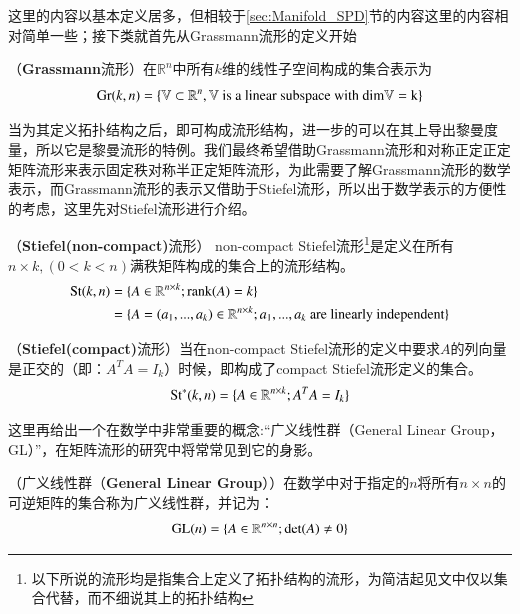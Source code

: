 这里的内容以基本定义居多，但相较于\ref{sec:Manifold_SPD}节的内容这里的内容相对简单一些；接下类就首先从Grassmann流形的定义开始
\begin{definition}
\label{Grassmann_def}
{\heiti （\textbf{Grassmann}流形）}在$\mathbb{R}^n$中所有$k$维的线性子空间构成的集合表示为
\begin{equation}
{\rm Gr}(k,n)=\{\mathbb{V} \subset \mathbb{R}^n,\mathbb{V}\text{ is a linear subspace with }\rm{dim}\mathbb{V}=k\}
\end{equation}
\end{definition}
当为其定义拓扑结构之后，即可构成流形结构，进一步的可以在其上导出黎曼度量\cite{Grassmann}，所以它是黎曼流形的特例。我们最终希望借助Grassmann流形和对称正定正定矩阵流形来表示固定秩对称半正定矩阵流形，为此需要了解Grassmann流形的数学表示，而Grassmann流形的表示又借助于Stiefel流形，所以出于数学表示的方便性的考虑，这里先对Stiefel流形进行介绍。
\begin{definition}
\label{Stiefel_nonCompact_def}
{\heiti （\textbf{Stiefel(non-compact)}流形）} non-compact Stiefel流形\footnote{以下所说的流形均是指集合上定义了拓扑结构的流形，为简洁起见文中仅以集合代替，而不细说其上的拓扑结构}是定义在所有$n\times k,(0<k<n)$满秩矩阵构成的集合上的流形结构。
\begin{equation}
\begin{split}
{\rm St}(k,n)&=\{A \in \mathbb{R}^{n\times k};{\rm rank}(A)=k\}\\
&=\{A=(a_1,...,a_k)\in \mathbb{R}^{n\times k}; a_1,...,a_k \text{ are linearly independent}\}
\end{split}
\end{equation}
\end{definition}
\begin{definition}
\label{Stiefel_Compact_def}
{\heiti （\textbf{Stiefel(compact)}流形）}当在non-compact Stiefel流形\footnotemark[\value{footnote}]的定义中要求$A$的列向量是正交的（即：$A^{T}A=I_k$）时候，即构成了compact Stiefel流形定义的集合。
\begin{equation}
{\rm St}^{*}(k,n)=\{A\in\mathbb{R}^{n\times k};A^{T}A=I_k\}
\end{equation}
\end{definition}
这里再给出一个在数学中非常重要的概念:“广义线性群（General Linear Group，GL）”，在矩阵流形的研究中将常常见到它的身影。
\begin{definition}
\label{General_Linear_Group}
{\heiti （广义线性群（\textbf{General Linear Group}））}在数学中对于指定的$n$将所有$n\times n$的可逆矩阵的集合称为广义线性群，并记为：
\begin{equation}
{\rm GL}(n)=\{A \in \mathbb{R}^{n\times n};{\rm{det}}(A)\neq 0\}
\end{equation}
\end{definition}

